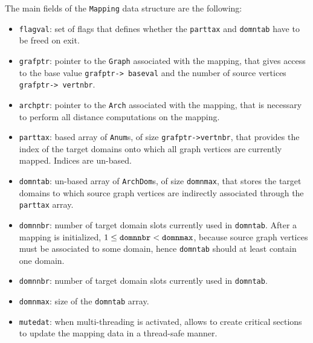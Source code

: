 The main fields of the \texttt{Mapping} data structure are the following:
\begin{itemize}
\item
\texttt{flagval}: set of flags that defines whether the
\texttt{parttax} and \texttt{domntab} have to be freed on exit.
\item
\texttt{grafptr}: pointer to the \texttt{Graph} associated with the
mapping, that gives access to the base value \texttt{grafptr->\lbt
baseval} and the number of source vertices \texttt{grafptr->\lbt
vertnbr}.
\item
\texttt{archptr}: pointer to the \texttt{Arch} associated with the
mapping, that is necessary to perform all distance computations on the
mapping.
\item
\texttt{parttax}: based array of \texttt{Anum}s, of size
\texttt{grafptr->\lbt vertnbr}, that provides the index of the target
domains onto which all graph vertices are currently mapped. Indices
are un-based.
\item
\texttt{domntab}: un-based array of \texttt{ArchDom}s, of size
\texttt{domnmax}, that stores the target domains to which source graph
vertices are indirectly associated through the \texttt{parttax} array.
\item
\texttt{domnnbr}: number of target domain slots currently used in
\texttt{domntab}. After a mapping is initialized, $1 \leq
\mbox{\texttt{domnnbr}} < \mbox{\texttt{domnmax}}$, because source
graph vertices must be associated to some domain, hence
\texttt{domntab} should at least contain one domain.
\item
\texttt{domnnbr}: number of target domain slots currently used in
\texttt{domntab}.
\item
\texttt{domnmax}: size of the \texttt{domntab} array.
\item
\texttt{mutedat}: when multi-threading is activated, allows to create
critical sections to update the mapping data in a thread-safe manner.
\end{itemize}
